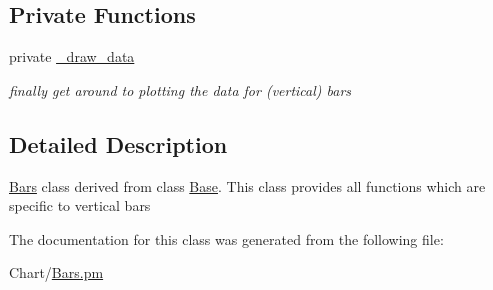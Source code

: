 \subsection*{Private Functions}
\label{_amgrp8d29cff216bafa3117e21883ea7c6b5f}
 \begin{DoxyCompactItemize}
\item 
\hypertarget{classChart_1_1Bars_ac15f867b92bbe0edcf3d971dc3a81812}{
private \hyperlink{classChart_1_1Bars_ac15f867b92bbe0edcf3d971dc3a81812}{\_\-draw\_\-data}}
\label{classChart_1_1Bars_ac15f867b92bbe0edcf3d971dc3a81812}

\begin{DoxyCompactList}\small\item\em finally get around to plotting the data for (vertical) bars \item\end{DoxyCompactList}\end{DoxyCompactItemize}


\subsection{Detailed Description}
\hyperlink{classChart_1_1Bars}{Bars} class derived from class \hyperlink{classChart_1_1Base}{Base}. This class provides all functions which are specific to vertical bars 

The documentation for this class was generated from the following file:\begin{DoxyCompactItemize}
\item 
Chart/\hyperlink{Bars_8pm}{Bars.pm}\end{DoxyCompactItemize}
